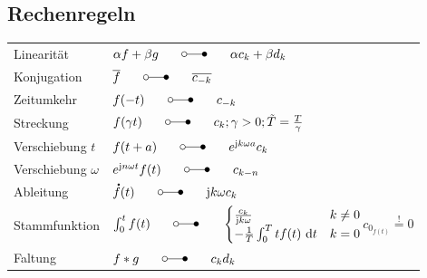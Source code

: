 \documentclass[6pt,a4paper]{scrartcl}
\let\oldlaplace = \laplace
\renewcommand*{\dot}[1]{\accentset{\mbox{\textrm{\large\bfseries .}} }{#1}}
\renewcommand{\i}{\ensuremath{\mathrm{j}}}										%
\newcommand{\ol}[1]{\ensuremath{\overline{#1}}}									%
\newcommand{\diff}{\ensuremath{\ \mathrm d}}									%
\renewcommand{\laplace}{\ \; \oldlaplace \ \;}
\renewcommand{\fourier}{\laplace}
\begin{document}
\begin{multicols}{4}
	\subsection{Rechenregeln}
	\begin{tabularx}{\columnwidth}{lX}
		Linearität & $\alpha f + \beta g \fourier \alpha c_k + \beta d_k$\\
		Konjugation & $\ol{f} \fourier \ol{c_{-k}}$\\
		Zeitumkehr & $f(-t) \fourier c_{-k}$\\
		Streckung & $f(\gamma t) \fourier c_k; \gamma > 0; \tilde{T} = \frac{T}{\gamma}$\\
		Verschiebung $t$ & $f(t + a) \fourier e^{\i k \omega a} c_k$\\
		Verschiebung $\omega$ & $e^{\i n \omega t} f(t) \fourier c_{k - n}$\\
		Ableitung & $\dot{f}(t) \fourier \i k \omega c_k$\\
		Stammfunktion & $\int_0^t f(t) \fourier \begin{cases} \frac{c_k}{\i k \omega} & k \neq 0\\ -\frac{1}{T}\int_0^T t f(t) \diff t & k = 0\\ \end{cases}$\linebreak $c_{0_{f(t)}} \stackrel{!}{=} 0$\\
		Faltung & $f * g \fourier c_k d_k$\\
	\end{tabularx}
	

\end{multicols}
\end{document}
